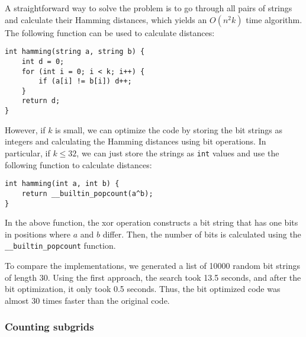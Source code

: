A straightforward way to solve the problem is
to go through all pairs of strings and calculate
their Hamming distances,
which yields an $O(n^2 k)$ time algorithm.
The following function can be used to
calculate distances:
\begin{lstlisting}
int hamming(string a, string b) {
    int d = 0;
    for (int i = 0; i < k; i++) {
        if (a[i] != b[i]) d++;
    }
    return d;
}
\end{lstlisting}

However, if $k$ is small, we can optimize the code
by storing the bit strings as integers and
calculating the Hamming distances using bit operations.
In particular, if $k \le 32$, we can just store
the strings as \texttt{int} values and use the
following function to calculate distances:
\begin{lstlisting}
int hamming(int a, int b) {
    return __builtin_popcount(a^b);
}
\end{lstlisting}
In the above function, the xor operation constructs
a bit string that has one bits in positions
where $a$ and $b$ differ.
Then, the number of bits is calculated using
the \texttt{\_\_builtin\_popcount} function.

To compare the implementations, we generated
a list of 10000 random bit strings of length 30.
Using the first approach, the search took
13.5 seconds, and after the bit optimization,
it only took 0.5 seconds.
Thus, the bit optimized code was almost
30 times faster than the original code.

\subsubsection{Counting subgrids}

